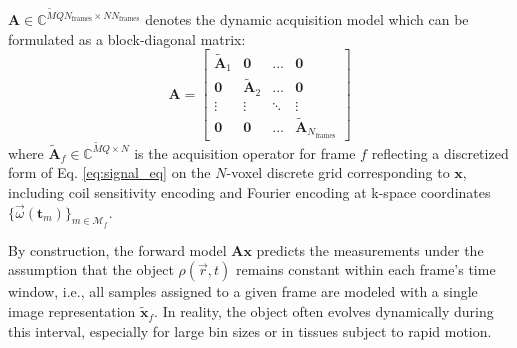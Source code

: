 \documentclass[11pt]{article}
\begin{document}
$\mathbf{A} \in \mathbb{C}^{\tilde{M}QN_\mathrm{frames} \times NN_\mathrm{frames}}$ denotes the dynamic acquisition model which can be formulated as a block-diagonal matrix:
\begin{equation*}
    \mathbf{A} = \begin{bmatrix}
        \tilde{\mathbf{A}}_1 & \mathbf{0} & ... & \mathbf{0} \\
        \mathbf{0} & \tilde{\mathbf{A}}_2 & ... & \mathbf{0} \\
        \vdots & \vdots & \ddots & \vdots \\
        \mathbf{0} & \mathbf{0} & ... & \tilde{\mathbf{A}}_{N_\mathrm{frames}}
    \end{bmatrix}
\end{equation*}
where $\tilde{\mathbf{A}}_f \in \mathbb{C}^{\tilde{M}Q \times N}$ is the acquisition operator for frame $f$ reflecting a discretized form of Eq. \ref{eq:signal_eq} on the $N$-voxel discrete grid corresponding to $\mathbf{x}$, including coil sensitivity encoding and Fourier encoding at k-space coordinates $\{\vec{\omega}(\mathbf{t}_m)\}_{m \in \mathcal{M}_f}$.

By construction, the forward model $\mathbf{A}\mathbf{x}$ predicts the measurements under the assumption that the object $\rho(\vec{r}, t)$ remains constant within each frame's time window, i.e., all samples assigned to a given frame are modeled with a single image representation $\tilde{\mathbf{x}}_f$.
In reality, the object often evolves dynamically during this interval, especially for large bin sizes or in tissues subject to rapid motion.
\end{document}

